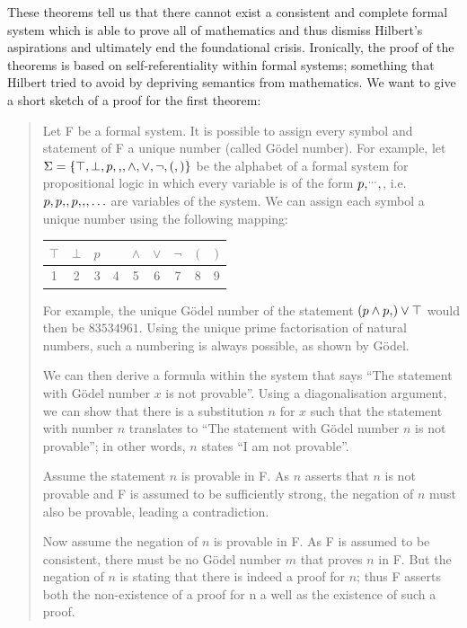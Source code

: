 \documentclass[hidelinks]{article}
\newcommand*\vtick{\textsc{\char13}}
\begin{document}
These theorems tell us that there cannot exist a consistent and complete formal system which is able to prove all of mathematics and thus dismiss Hilbert's aspirations and ultimately end the foundational crisis. Ironically, the proof of the theorems is based on self-referentiality within formal systems; something that Hilbert tried to avoid by depriving semantics from mathematics.
We want to give a short sketch of a proof for the first theorem:
\begin{quote}
Let F be a formal system. It is possible to assign every symbol and statement of F a unique number (called Gödel number). For example, let $\Sigma=\{\top,\bot,p,\vtick,\land,\lor,\lnot,(,)\}$ be the alphabet of a formal system for propositional logic in which every variable is of the form $p\vtick^{\ldots}\vtick$, i.e.\ $p,p\vtick,p\vtick\vtick,\ldots$ are variables of the system. We can assign each symbol a unique number using the following mapping:

\begin{center}
\begin{tabular}{| c | c | c | c | c | c | c | c | c |}
\hline $\top$ & $\bot$ & $p$ & \vtick & $\land$ & $\lor$ & $\lnot$ & $($ & $)$ \\
\hline 1 & 2 & 3 & 4 & 5 & 6 & 7 & 8 & 9\\
\hline
\end{tabular}
\end{center}
For example, the unique Gödel number of the statement $(p\land p\vtick)\lor \top$ would then be $83534961$. Using the unique prime factorisation of natural numbers, such a numbering is always possible, as shown by Gödel.

We can then derive a formula within the system that says ``The statement with Gödel number $x$ is not provable''. Using a diagonalisation argument, we can show that there is a substitution $n$ for $x$ such that the statement with number $n$ translates to ``The statement with Gödel number $n$ is not provable''; in other words, $n$ states ``I am not provable''.

Assume the statement $n$ is provable in F. As $n$ asserts that $n$ is not provable and F is assumed to be sufficiently strong, the negation of $n$ must also be provable, leading a contradiction.

Now assume the negation of $n$ is provable in F. As F is assumed to be consistent, there must be no Gödel number $m$ that proves $n$ in F. But the negation of $n$ is stating that there is indeed a proof for $n$; thus F asserts both the non-existence of a proof for n a well as the existence of such a proof.
\end{quote}
\end{document}
